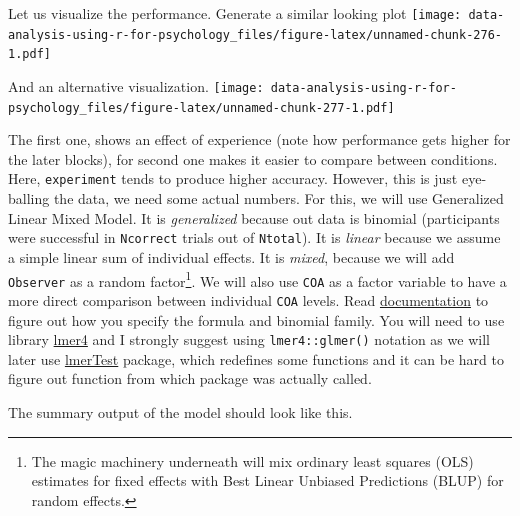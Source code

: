 \documentclass[
]{book}
\begin{document}
Let us visualize the performance. Generate a similar looking plot
\texttt{[image: data-analysis-using-r-for-psychology\_files/figure-latex/unnamed-chunk-276-1.pdf]}

And an alternative visualization.
\texttt{[image: data-analysis-using-r-for-psychology\_files/figure-latex/unnamed-chunk-277-1.pdf]}

The first one, shows an effect of experience (note how performance gets higher for the later blocks), for second one makes it easier to compare between conditions. Here, \texttt{experiment} tends to produce higher accuracy. However, this is just eye-balling the data, we need some actual numbers. For this, we will use Generalized Linear Mixed Model. It is \emph{generalized} because out data is binomial (participants were successful in \texttt{Ncorrect} trials out of \texttt{Ntotal}). It is \emph{linear} because we assume a simple linear sum of individual effects. It is \emph{mixed}, because we will add \texttt{Observer} as a random factor\footnote{The magic machinery underneath will mix ordinary least squares (OLS) estimates for fixed effects with Best Linear Unbiased Predictions (BLUP) for random effects.}. We will also use \texttt{COA} as a factor variable to have a more direct comparison between individual \texttt{COA} levels. Read \href{https://www.rdocumentation.org/packages/lme4/versions/1.1-26/topics/glmer}{documentation} to figure out how you specify the formula and binomial family. You will need to use library \href{https://github.com/lme4/lme4}{lmer4} and I strongly suggest using \texttt{lmer4::glmer()} notation as we will later use \href{}{lmerTest} package, which redefines some functions and it can be hard to figure out function from which package was actually called.

The summary output of the model should look like this.
\end{document}
